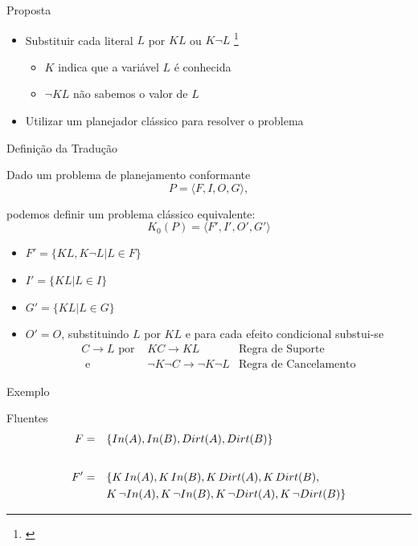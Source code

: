 \begin{frame}{Proposta}
    \begin{itemize}
    \item Substituir cada literal $L$ por $ KL$ ou $K \lnot L$ \footnote{\cite{Palacios:2009}}
        \begin{itemize}
            \item $K$ indica que a variável $L$ é conhecida 
            \item $\lnot KL$ não sabemos o valor de $L$
        \end{itemize}  
    \item Utilizar um planejador clássico para resolver o problema
    \end{itemize}  
\end{frame}

\begin{frame}{Definição da Tradução}

    Dado um problema de planejamento conformante\\
    \[P=\langle F, I, O, G\rangle,\]
    
    podemos definir um problema clássico equivalente:\\
    \[K_0(P)=\langle F', I', O', G'\rangle\]
    \begin{itemize}
        \item $F' = \{ KL, K \lnot L | L \in F \}$
        \item $I' = \{ KL | L \in I \}$
        \item $G' = \{ KL | L \in G \}$
        \item $O' = O$, substituindo $L$ por $KL$ e para cada efeito condicional substui-se 
        \begin{align*}C \rightarrow L \text{ por } & KC \rightarrow KL &\text{Regra de Suporte} \\ 
                                        \text{ e } & \lnot K \lnot C \rightarrow \lnot K \lnot L& \text{Regra de Cancelamento}
        \end{align*}
    \end{itemize}  
\end{frame}

\begin{frame}{Exemplo}
     \begin{block}{Fluentes}
        \begin{align*}
                F = \quad  & \{ In(A),In(B),Dirt(A),Dirt(B) \} \\ \intertext{}
                F' = \quad  & \{ K\, In(A),K\, In(B),K\, Dirt(A),K\, Dirt(B),\\
                            & K\,\lnot In(A),K\,\lnot In(B),K\,\lnot Dirt(A),K\,\lnot Dirt(B) \}\\
        \end{align*}
    \end{block}    
\end{frame}

